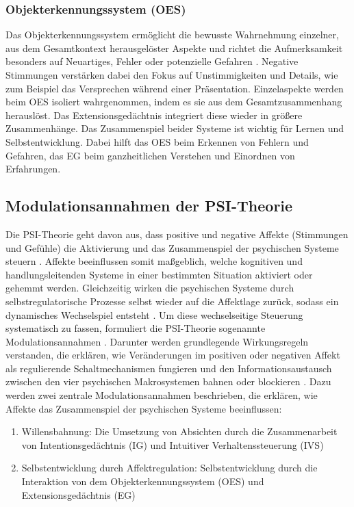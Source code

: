 \subsubsection{Objekterkennungssystem (OES)}
Das Objekterkennungssystem ermöglicht die bewusste Wahrnehmung einzelner, aus dem Gesamtkontext herausgelöster Aspekte und richtet die Aufmerksamkeit besonders auf Neuartiges, Fehler oder potenzielle Gefahren \citep{kuhl2005neue,kuhl2014psi}. Negative Stimmungen verstärken dabei den Fokus auf Unstimmigkeiten und Details, wie zum Beispiel das Versprechen während einer Präsentation. Einzelaspekte werden beim OES isoliert wahrgenommen, indem es sie aus dem Gesamtzusammenhang herauslöst. Das Extensionsgedächtnis integriert diese wieder in größere Zusammenhänge. Das Zusammenspiel beider Systeme ist wichtig für Lernen und Selbstentwicklung. Dabei hilft das OES beim Erkennen von Fehlern und Gefahren, das EG beim ganzheitlichen Verstehen und Einordnen von Erfahrungen.

\subsection{Modulationsannahmen der PSI-Theorie}
Die PSI-Theorie geht davon aus, dass positive und negative Affekte (Stimmungen und Gefühle) die Aktivierung und das Zusammenspiel der psychischen Systeme steuern \citep{kuhl2014psi}. Affekte beeinflussen somit maßgeblich, welche kognitiven und handlungsleitenden Systeme in einer bestimmten Situation aktiviert oder gehemmt werden. Gleichzeitig wirken die psychischen Systeme durch selbstregulatorische Prozesse selbst wieder auf die Affektlage zurück, sodass ein dynamisches Wechselspiel entsteht \citep{kuhl2005neue,kuhl2014psi}. Um diese wechselseitige Steuerung systematisch zu fassen, formuliert die PSI-Theorie sogenannte Modulationsannahmen \citep{kuhl2014psi}. Darunter werden grundlegende Wirkungsregeln verstanden, die erklären, wie Veränderungen im positiven oder negativen Affekt als regulierende Schaltmechanismen fungieren und den Informationsaustausch zwischen den vier psychischen Makrosystemen bahnen oder blockieren \citep{kuhl2005neue,kuhl2014psi}. Dazu werden zwei zentrale Modulationsannahmen beschrieben, die erklären, wie Affekte das Zusammenspiel der psychischen Systeme beeinflussen:

\begin{enumerate}
  \renewcommand{\labelenumi}{(\arabic{enumi})}
  \item Willensbahnung: Die Umsetzung von Absichten durch die Zusammenarbeit von Intentionsgedächtnis (IG) und Intuitiver Verhaltenssteuerung (IVS)
  \item Selbstentwicklung durch Affektregulation: Selbstentwicklung durch die Interaktion von dem Objekterkennungssystem (OES) und Extensionsgedächtnis (EG)
\end{enumerate}

